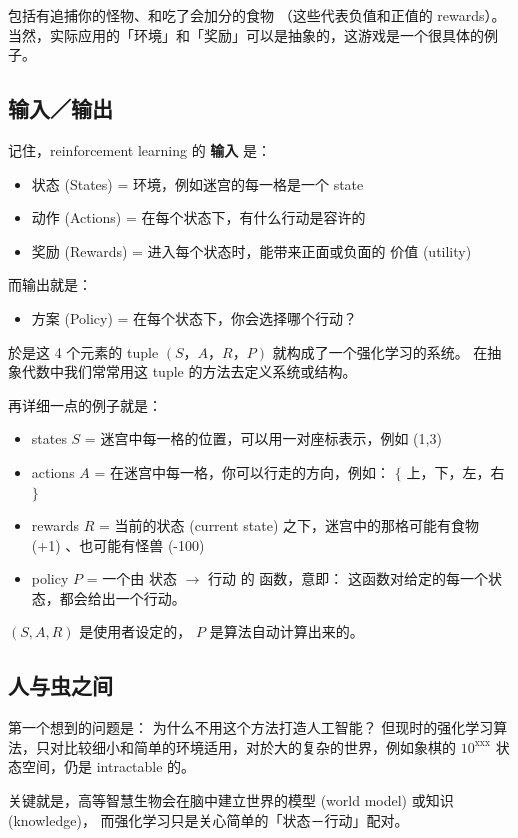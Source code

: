 \documentclass[orivec]{llncs}
\newcommand{\emp}[1]{\textbf{\textcolor{Cerulean}{#1}}}
\begin{document}
包括有追捕你的怪物、和吃了会加分的食物 （这些代表负值和正值的 rewards）。  当然，实际应用的「环境」和「奖励」可以是抽象的，这游戏是一个很具体的例子。

\subsection{输入／输出}

记住，reinforcement learning 的 \emp{输入} 是：
\begin{itemize}
\item 状态 (States) = 环境，例如迷宫的每一格是一个 state
\item 动作 (Actions) = 在每个状态下，有什么行动是容许的
\item 奖励 (Rewards) = 进入每个状态时，能带来正面或负面的 价值 (utility)
\end{itemize}
而输出就是：
\begin{itemize}
\item 方案 (Policy) = 在每个状态下，你会选择哪个行动？
\end{itemize}
於是这 4 个元素的 tuple $(S，A，R，P)$ 就构成了一个强化学习的系统。   在抽象代数中我们常常用这 tuple 的方法去定义系统或结构。

再详细一点的例子就是：
\begin{itemize}
\item states $S$ = 迷宫中每一格的位置，可以用一对座标表示，例如 (1,3)
\item actions $A$ = 在迷宫中每一格，你可以行走的方向，例如： $\{$ 上，下，左，右 $\}$
\item rewards $R$ = 当前的状态 (current state) 之下，迷宫中的那格可能有食物 (+1) 、也可能有怪兽 (-100)
\item policy $P$ = 一个由 状态 $\rightarrow$ 行动 的 函数，意即： 这函数对给定的每一个状态，都会给出一个行动。 
\end{itemize}
$(S, A, R)$ 是使用者设定的， $P$ 是算法自动计算出来的。  

\subsection{人与虫之间}

第一个想到的问题是： 为什么不用这个方法打造人工智能？  但现时的强化学习算法，只对比较细小和简单的环境适用，对於大的复杂的世界，例如象棋的 $10^{\mbox{xxx}}$ 状态空间，仍是 intractable 的。

关键就是，高等智慧生物会在脑中建立世界的模型 (world model) 或知识 (knowledge)， 而强化学习只是关心简单的「状态－行动」配对。
\end{document}
